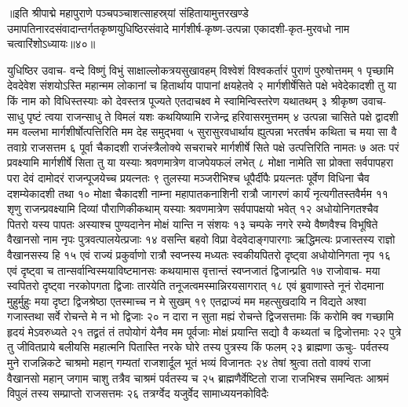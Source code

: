 ॥इति श्रीपाद्मे महापुराणे पञ्चपञ्चाशत्साहस्र्यां संहितायामुत्तरखण्डे उमापतिनारदसंवादान्तर्गतकृष्णयुधिष्ठिरसंवादे मार्गशीर्ष-कृष्ण-उत्पन्ना एकादशी-कृत-मुरवधो नाम चत्वारिंशोऽध्यायः॥४०॥



युधिष्ठिर उवाच-
वन्दे विष्णुं विभुं साक्षाल्लोकत्रयसुखावहम् 
विश्वेशं विश्वकर्तारं पुराणं पुरुषोत्तमम् १
पृच्छामि देवदेवेश संशयोऽस्ति महान्मम 
लोकानां च हितार्थाय पापानां क्षयहेतवे २
मार्गशीर्षेसिते पक्षे भवेदेकादशी तु या 
किं नाम को विधिस्तस्याः को देवस्तत्र पूज्यते 
एतदाचक्ष्व मे स्वामिन्विस्तरेण यथातथम् ३
श्रीकृष्ण उवाच-
साधु पृष्टं त्वया राजन्साधु ते विमलं यशः 
कथयिष्यामि राजेन्द्र हरिवासरमुत्तमम् ४
उत्पन्ना चासिते पक्षे द्वादशी मम वल्लभा 
मार्गशीर्षोत्पत्तिरिति मम देह समुद्भवा ५
सुरासुरवधार्थाय ह्युत्पन्ना भरतर्षभ 
कथिता च मया सा वै तवाग्रे राजसत्तम ६
पूर्वा चैकादशी राजंस्त्रैलोक्ये सचराचरे 
मार्गशीर्षे सिते पक्षे उत्पत्तिरिति नामतः ७
अतः परं प्रवक्ष्यामि मार्गशीर्षे सिता तु या 
यस्याः श्रवणमात्रेण वाजपेयफलं लभेत् ८
मोक्षा नामेति सा प्रोक्ता सर्वपापहरा परा 
देवं दामोदरं राजन्पूजयेच्च प्रयत्नतः ९
तुलस्या मञ्जरीभिश्च धूपैर्दीपैः प्रयत्नतः 
पूर्वेण विधिना चैव दशम्येकादशी तथा १०
मोक्षा चैकादशी नाम्ना महापातकनाशिनी 
रात्रौ जागरणं कार्यं नृत्यगीतस्तवैर्मम ११
शृणु राजन्प्रवक्ष्यामि दिव्यां पौराणिकीकथाम् 
यस्याः श्रवणमात्रेण सर्वपापक्षयो भवेत् १२
अधोयोनिगतश्चैव पितरो यस्य पापतः 
अस्याश्च पुण्यदानेन मोक्षं यान्ति न संशयः १३
चम्पके नगरे रम्ये वैष्णवैश्च विभूषिते 
वैखानसो नाम नृपः पुत्रवत्पालयेत्प्रजाः १४
वसन्ति बहवो विप्रा वेदवेदाङ्गपारगाः 
ऋद्धिमत्यः प्रजास्तस्य राज्ञो वैखानसस्य हि १५
एवं राज्यं प्रकुर्वाणो रात्रौ स्वप्नस्य मध्यतः 
स्वकीयपितरो दृष्ट्वा अधोयोनिगता नृप १६
एवं दृष्ट्वा च तान्सर्वान्विस्मयाविष्टमानसः 
कथयामास वृत्तान्तं स्वप्नजातं द्विजान्प्रति १७
राजोवाच-
मया स्वपितरो दृष्ट्वा नरकोपगता द्विजाः 
तारयेति तनूजत्वमस्मान्निरयसागरात् १८
एवं ब्रुवाणास्ते नूनं रोदमाना मुहुर्मुहुः 
मया दृष्टा द्विजश्रेष्ठा एतस्माच्च न मे सुखम् १९
एतद्राज्यं मम महत्सुखदायि न विद्यते 
अश्वा गजास्तथा सर्वे रोचन्ते मे न भो द्विजाः २०
न दारा न सुता मह्यं रोचन्ते द्विजसत्तमाः 
किं करोमि क्व गच्छामि हृदयं मेऽवरुध्यते २१
तद्व्रतं तं तपोयोगं येनैव मम पूर्वजाः 
मोक्षं प्रयान्ति सद्यो वै कथ्यतां च द्विजोत्तमाः २२
पुत्रे तु जीवितप्राये बलीयसि महात्मनि 
पितास्ति नरके घोरे तस्य पुत्रस्य किं फलम् २३
ब्राह्मणा ऊचुः-
पर्वतस्य मुने राजन्निकटे चाश्रमो महान् 
गम्यतां राजशार्दूल भूतं भव्यं विजानतः २४
तेषां श्रुत्वा ततो वाक्यं राजा वैखानसो महान् 
जगाम चाशु तत्रैव चाश्रमं पर्वतस्य च २५
ब्राह्मणैर्वेष्टितो राजा राजभिश्च समन्वितः 
आश्रमं विपुलं तस्य सम्प्राप्तो राजसत्तमः २६
तत्रर्ग्वेद यजुर्वेद सामाध्ययनकोविदैः 
